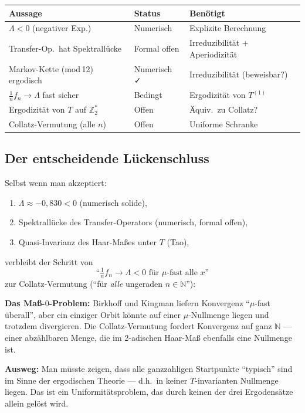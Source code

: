 \documentclass[12pt,a4paper]{article}
\newcommand{\N}{\mathbb{N}}
\newcommand{\Ztwo}{\mathbb{Z}_2}
\begin{document}
\begin{center}
\renewcommand{\arraystretch}{1.4}
\begin{tabular}{>{\raggedright}p{5.5cm}
                >{\centering}p{2.0cm}
                >{\raggedright\arraybackslash}p{4.5cm}}
\toprule
\textbf{Aussage} & \textbf{Status} & \textbf{Benötigt} \\
\midrule
$\Lambda < 0$ (negativer Exp.) & Numerisch & Explizite Berechnung \\
Transfer-Op.\ hat Spektrallücke & Formal offen & Irreduzibilität + Aperiodizität \\
Markov-Kette (mod\,12) ergodisch & Numerisch ✓ & Irreduzibilität (beweisbar?) \\
$\frac{1}{n}f_n \to \Lambda$ fast sicher & \textcolor{warnorange}{Bedingt} & Ergodizität von $T^{(1)}$ \\
Ergodizität von $T$ auf $\Ztwo^*$ & \textcolor{lückenrot}{Offen} & Äquiv.\ zu Collatz? \\
Collatz-Vermutung (alle $n$) & \textcolor{lückenrot}{Offen} & Uniforme Schranke \\
\bottomrule
\end{tabular}
\end{center}

\subsection{Der entscheidende Lückenschluss}

\begin{tcolorbox}[lücke, title={Die letzte offene Lücke}]
Selbst wenn man akzeptiert:
\begin{enumerate}[label=(\arabic*), nosep]
  \item $\Lambda \approx -0{,}830 < 0$ (numerisch solide),
  \item Spektrallücke des Transfer-Operators (numerisch, formal offen),
  \item Quasi-Invarianz des Haar-Maßes unter $T$ (Tao),
\end{enumerate}
verbleibt der Schritt von
\[
  \text{``}\tfrac{1}{n}f_n \to \Lambda < 0 \text{ für } \mu\text{-fast alle } x\text{''}
\]
zur Collatz-Vermutung (``für \emph{alle} ungeraden $n \in \N$''):

\medskip
\textbf{Das Maß-$0$-Problem:} Birkhoff und Kingman liefern Konvergenz
``$\mu$-fast überall'', aber ein einziger Orbit könnte auf einer
$\mu$-Nullmenge liegen und trotzdem divergieren. Die Collatz-Vermutung
fordert Konvergenz auf ganz $\N$ --- einer abzählbaren Menge, die
im 2-adischen Haar-Maß ebenfalls eine Nullmenge ist.

\medskip
\textbf{Ausweg:} Man müsste zeigen, dass alle ganzzahligen Startpunkte
``typisch'' sind im Sinne der ergodischen Theorie --- d.h.\ in keiner
$T$-invarianten Nullmenge liegen. Das ist ein Uniformitätsproblem, das
durch keinen der drei Ergodensätze allein gelöst wird.
\end{tcolorbox}
\end{document}
